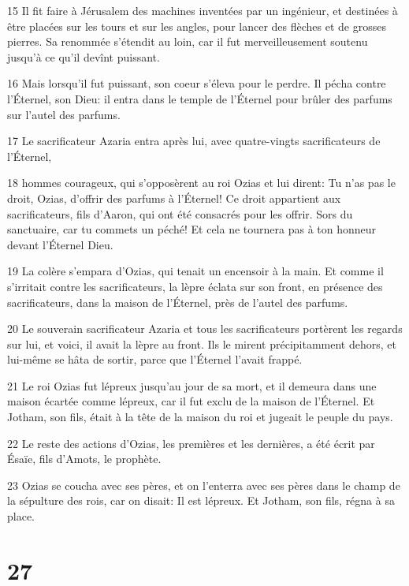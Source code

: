 \par 15 Il fit faire à Jérusalem des machines inventées par un ingénieur, et destinées à être placées sur les tours et sur les angles, pour lancer des flèches et de grosses pierres. Sa renommée s'étendit au loin, car il fut merveilleusement soutenu jusqu'à ce qu'il devînt puissant.
\par 16 Mais lorsqu'il fut puissant, son coeur s'éleva pour le perdre. Il pécha contre l'Éternel, son Dieu: il entra dans le temple de l'Éternel pour brûler des parfums sur l'autel des parfums.
\par 17 Le sacrificateur Azaria entra après lui, avec quatre-vingts sacrificateurs de l'Éternel,
\par 18 hommes courageux, qui s'opposèrent au roi Ozias et lui dirent: Tu n'as pas le droit, Ozias, d'offrir des parfums à l'Éternel! Ce droit appartient aux sacrificateurs, fils d'Aaron, qui ont été consacrés pour les offrir. Sors du sanctuaire, car tu commets un péché! Et cela ne tournera pas à ton honneur devant l'Éternel Dieu.
\par 19 La colère s'empara d'Ozias, qui tenait un encensoir à la main. Et comme il s'irritait contre les sacrificateurs, la lèpre éclata sur son front, en présence des sacrificateurs, dans la maison de l'Éternel, près de l'autel des parfums.
\par 20 Le souverain sacrificateur Azaria et tous les sacrificateurs portèrent les regards sur lui, et voici, il avait la lèpre au front. Ils le mirent précipitamment dehors, et lui-même se hâta de sortir, parce que l'Éternel l'avait frappé.
\par 21 Le roi Ozias fut lépreux jusqu'au jour de sa mort, et il demeura dans une maison écartée comme lépreux, car il fut exclu de la maison de l'Éternel. Et Jotham, son fils, était à la tête de la maison du roi et jugeait le peuple du pays.
\par 22 Le reste des actions d'Ozias, les premières et les dernières, a été écrit par Ésaïe, fils d'Amots, le prophète.
\par 23 Ozias se coucha avec ses pères, et on l'enterra avec ses pères dans le champ de la sépulture des rois, car on disait: Il est lépreux. Et Jotham, son fils, régna à sa place.

\chapter{27}

